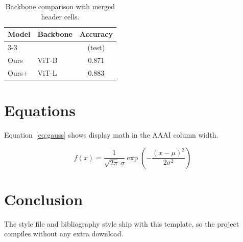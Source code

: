 \documentclass[letterpaper]{article}
\begin{document}
\begin{table}[t]
  \caption{Backbone comparison with merged header cells.}
  \label{tab:merged}
  \centering
  \begin{tabular}{llc}
    \toprule
    \multirow{2}{*}{Model} & \multirow{2}{*}{Backbone} & Accuracy \\
    \cmidrule(l){3-3}
     & & (test) \\
    \midrule
    Ours  & ViT-B & 0.871 \\
    Ours+ & ViT-L & 0.883 \\
    \bottomrule
  \end{tabular}
\end{table}

\section{Equations}
Equation~\eqref{eq:gauss} shows display math in the AAAI column width.

\begin{equation}
  f(x)=\frac{1}{\sqrt{2\pi}\,\sigma}
  \exp\!\left(-\frac{(x-\mu)^2}{2\sigma^2}\right)
  \label{eq:gauss}
\end{equation}

\section{Conclusion}
The style file and bibliography style ship with this template, so the
project compiles without any extra download.


\end{document}
